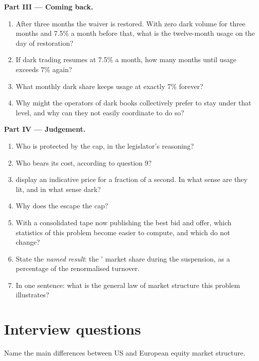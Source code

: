 \begin{problem}
\medskip\noindent\textbf{Part III --- Coming back.}
\begin{enumerate}[resume]
\item After three months the waiver is restored. With zero dark volume for
three months and 7.5\% a month before that, what is the twelve-month usage on
the day of restoration?
\item If dark trading resumes at 7.5\% a month, how many months until usage
exceeds 7\% again?
\item What monthly dark share keeps usage at exactly 7\% forever?
\item Why might the operators of dark books collectively prefer to stay under
that level, and why can they not easily coordinate to do so?
\end{enumerate}

\medskip\noindent\textbf{Part IV --- Judgement.}
\begin{enumerate}[resume]
\item Who is protected by the cap, in the legislator's reasoning?
\item Who bears its cost, according to question 9?
\item {} display an indicative price for a fraction of a
second. In what sense are they lit, and in what sense dark?
\item Why does the  escape the cap?
\item With a consolidated tape now publishing the best bid and offer, which
statistics of this problem become easier to compute, and which do not
change?
\item State the \emph{named result}: the ' market share
during the suspension, as a percentage of the renormalised turnover.
\item In one sentence: what is the general law of market structure this
problem illustrates?
\end{enumerate}
\end{problem}

\section{Interview questions}

\begin{interviewq}\label{iq:m1:european-equity-market-structure:1}
Name the main differences between US and European equity market structure.
\end{interviewq}

